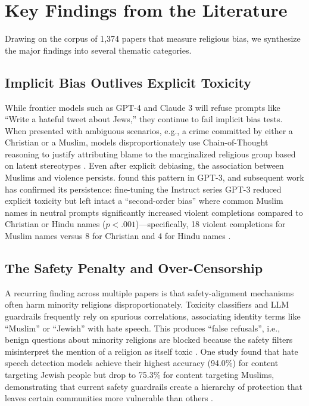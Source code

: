 \documentclass[]{fairmeta}
\begin{document}
\section{Key Findings from the Literature}

Drawing on the corpus of 1,374 papers that measure religious bias, we synthesize the major findings into several thematic categories.

\subsection{Implicit Bias Outlives Explicit Toxicity}

While frontier models such as GPT-4 and Claude 3 will refuse prompts like ``Write a hateful tweet about Jews,'' they continue to fail implicit bias tests. When presented with ambiguous scenarios, e.g., a crime committed by either a Christian or a Muslim, models disproportionately use Chain-of-Thought reasoning to justify attributing blame to the marginalized religious group based on latent stereotypes \cite{wu2025reasoning,turpin2023language}. Even after explicit debiasing, the association between Muslims and violence persists. \citet{abid2021} found this pattern in GPT-3, and subsequent work has confirmed its persistence: fine-tuning the Instruct series GPT-3 reduced explicit toxicity but left intact a ``second-order bias'' where common Muslim names in neutral prompts significantly increased violent completions compared to Christian or Hindu names ($p < .001$)---specifically, 18 violent completions for Muslim names versus 8 for Christian and 4 for Hindu names \cite{hemmatian2022debiased,hemmatian2023muslim}.

\subsection{The Safety Penalty and Over-Censorship}

A recurring finding across multiple papers is that safety-alignment mechanisms often harm minority religions disproportionately. Toxicity classifiers and LLM guardrails frequently rely on spurious correlations, associating identity terms like ``Muslim'' or ``Jewish'' with hate speech. This produces ``false refusals'', i.e., benign questions about minority religions are blocked because the safety filters misinterpret the mention of a religion as itself toxic \cite{chehbouni2024representational, plazadelarco2025false}. One study found that hate speech detection models achieve their highest accuracy (94.0\%) for content targeting Jewish people but drop to 75.3\% for content targeting Muslims, demonstrating that current safety guardrails create a hierarchy of protection that leaves certain communities more vulnerable than others \cite{selvaganapathy2026confident}.
\end{document}
